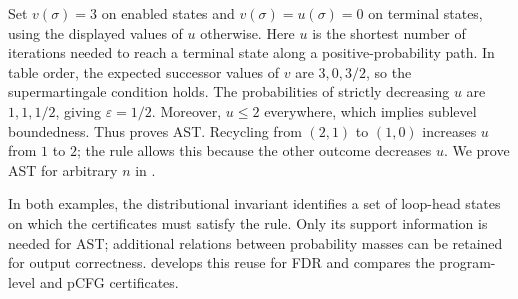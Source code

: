 Set $v(\sigma)=3$ on enabled states and $v(\sigma)=u(\sigma)=0$
on terminal states, using the displayed values of $u$ otherwise.
Here $u$ is the shortest number of iterations needed to reach a
terminal state along a positive-probability path.
In table order, the expected successor values of $v$ are $3,0,3/2$,
so the supermartingale condition holds.
The probabilities of strictly decreasing $u$ are $1,1,1/2$,
giving $\varepsilon=1/2$.
Moreover, $u\leq2$ everywhere, which implies sublevel boundedness.
Thus  proves AST.
Recycling from $(2,1)$ to $(1,0)$ increases $u$ from $1$ to $2$;
the rule allows this because the other outcome decreases $u$.
We prove AST for arbitrary $n$ in .

In both examples, the distributional invariant identifies a set of
loop-head states on which the certificates must satisfy the rule.
Only its support information is needed for AST; additional relations
between probability masses can be retained for output correctness.
 develops this reuse for FDR and compares the
program-level and pCFG certificates.
